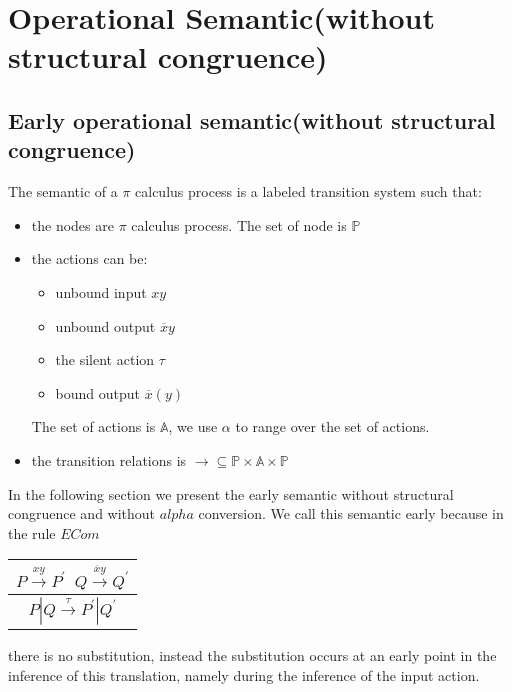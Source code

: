 \section{Operational Semantic(without structural congruence)}
\subsection{Early operational semantic(without structural congruence)}
The semantic of a $\pi$ calculus process is a labeled transition system such that:
\begin{itemize}
  \item 
    the nodes are $\pi$ calculus process. The set of node is $\mathbb{P}$
  \item
    the actions can be:
    \begin{itemize}
      \item unbound input $xy$
      \item unbound output $\overline{x}y$
      \item the silent action $\tau$
      \item bound output $\overline{x}(y)$
    \end{itemize}
    The set of actions is $\mathbb{A}$, we use $\alpha$ to range over the set of actions.
  \item
    the transition relations is $\rightarrow\subseteq \mathbb{P}\times \mathbb{A}\times \mathbb{P}$
\end{itemize}
In the following section we present the early semantic without structural congruence and without $alpha$ conversion. We call this semantic early because in the rule $ECom$
\begin{center}
  \begin{tabular}{c}
    $P \xrightarrow{xy} P^{'}\;\; Q\xrightarrow{\overline{x}y} Q^{'}$\\
    \hline
    $P|Q \xrightarrow{\tau} P^{'}|Q^{'}$
  \end{tabular}
\end{center}
there is no substitution, instead the substitution occurs at an early point in the inference of this translation, namely during the inference of the input action. 

